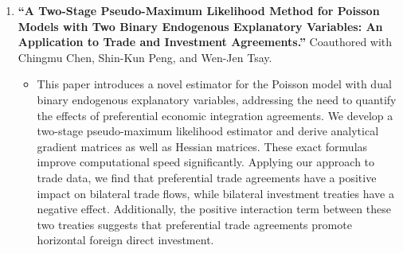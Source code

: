 \documentclass{article}
\begin{document}
\begin{enumerate}[resume]
\begin{itemize}
    \end{itemize}
    \item \textbf{“A Two-Stage Pseudo-Maximum Likelihood Method for Poisson Models with Two Binary Endogenous Explanatory Variables: An Application to Trade and Investment Agreements.”} Coauthored with Chingmu Chen, Shin-Kun Peng, and Wen-Jen Tsay. 
    \begin{itemize}
        \item[] This paper introduces a novel estimator for the Poisson model with dual binary endogenous explanatory variables, addressing the need to quantify the effects of preferential economic integration agreements. We develop a two-stage pseudo-maximum likelihood estimator and derive analytical gradient matrices as well as Hessian matrices. These exact formulas improve computational speed significantly. Applying our approach to trade data, we find that preferential trade agreements have a positive impact on bilateral trade flows, while bilateral investment treaties have a negative effect. Additionally, the positive interaction term between these two treaties suggests that preferential trade agreements promote horizontal foreign direct investment.
    \end{itemize}

\newpage


\end{enumerate}
\end{document}
